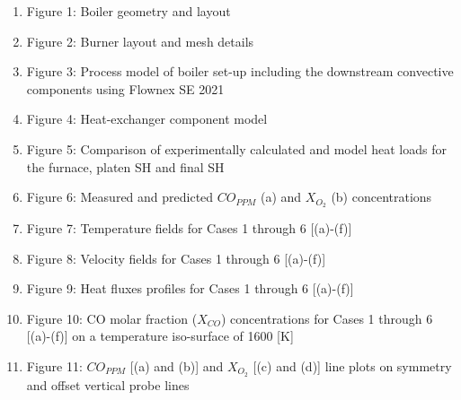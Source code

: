 \documentclass[11pt,cleanfoot]{asme2ej}
\begin{document}
\begin{enumerate}[label=\arabic*]
\item Figure 1: Boiler geometry and layout \label{fig_geometry}\\

\item Figure 2: Burner layout and mesh details \label{fig_burner_mesh}\\

\item Figure 3: Process model of boiler set-up including the downstream convective components using Flownex SE\textsuperscript{\textregistered} 2021 \label{fig_flownex}\\

\item Figure 4: Heat-exchanger component model \label{fig_heat_exchanger_model}\\

\item Figure 5: Comparison of experimentally calculated and model heat loads for the furnace, platen SH and final SH \label{fig_heat_valid}\\
\item Figure 6: Measured and predicted $CO_{PPM}$ (a) and $X_{O_{2}}$ (b) concentrations \label{fig_probe_valid}\\
\item Figure 7: Temperature fields for Cases 1 through 6 [(a)-(f)] \label{fig_cfd_temp}\\
\item Figure 8: Velocity fields for Cases 1 through 6 [(a)-(f)] \label{fig_cfd_velo}\\
\item Figure 9: Heat fluxes profiles for Cases 1 through 6 [(a)-(f)] \label{fig_cfd_heat_flux}\\
\item Figure 10: CO molar fraction ($X_{CO}$) concentrations for Cases 1 through 6 [(a)-(f)] on a temperature iso-surface of 1600 [K] \label{fig_cfd_coppm}\\
\item Figure 11: $CO_{PPM}$ [(a) and (b)] and $X_{O_{2}}$ [(c) and (d)] line plots on symmetry and offset vertical probe lines \label{fig_cfd_probe}
\end{enumerate}

\newpage
\end{document}
